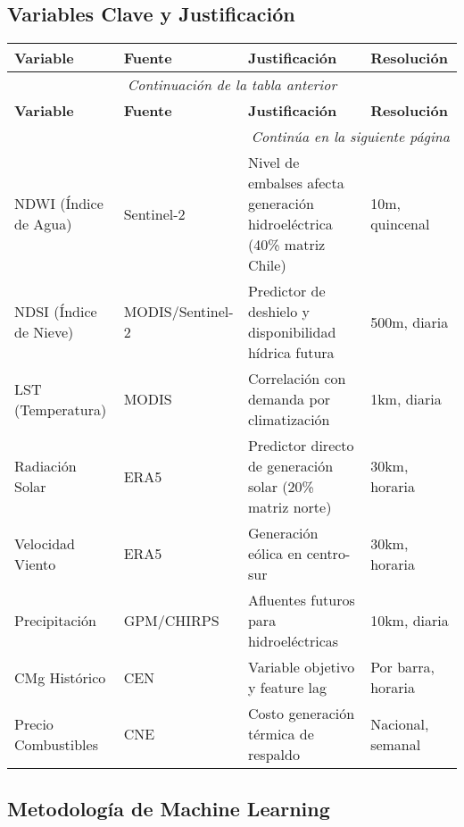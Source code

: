 \documentclass[12pt,a4paper]{article}
\begin{document}
\subsection{Variables Clave y Justificación}

\begin{longtable}{|p{3.5cm}|p{4cm}|p{5cm}|p{3cm}|}
\hline
\textbf{Variable} & \textbf{Fuente} & \textbf{Justificación} & \textbf{Resolución} \\
\hline
\endfirsthead
\multicolumn{4}{c}{\textit{Continuación de la tabla anterior}} \\
\hline
\textbf{Variable} & \textbf{Fuente} & \textbf{Justificación} & \textbf{Resolución} \\
\hline
\endhead
\hline
\multicolumn{4}{r}{\textit{Continúa en la siguiente página}} \\
\endfoot
\hline
\endlastfoot

NDWI (Índice de Agua) & Sentinel-2 & Nivel de embalses afecta generación hidroeléctrica (40\% matriz Chile) & 10m, quincenal \\
\hline
NDSI (Índice de Nieve) & MODIS/Sentinel-2 & Predictor de deshielo y disponibilidad hídrica futura & 500m, diaria \\
\hline
LST (Temperatura) & MODIS & Correlación con demanda por climatización & 1km, diaria \\
\hline
Radiación Solar & ERA5 & Predictor directo de generación solar (20\% matriz norte) & 30km, horaria \\
\hline
Velocidad Viento & ERA5 & Generación eólica en centro-sur & 30km, horaria \\
\hline
Precipitación & GPM/CHIRPS & Afluentes futuros para hidroeléctricas & 10km, diaria \\
\hline
CMg Histórico & CEN & Variable objetivo y feature lag & Por barra, horaria \\
\hline
Precio Combustibles & CNE & Costo generación térmica de respaldo & Nacional, semanal \\
\hline
\end{longtable}

\subsection{Metodología de Machine Learning}
\end{document}
